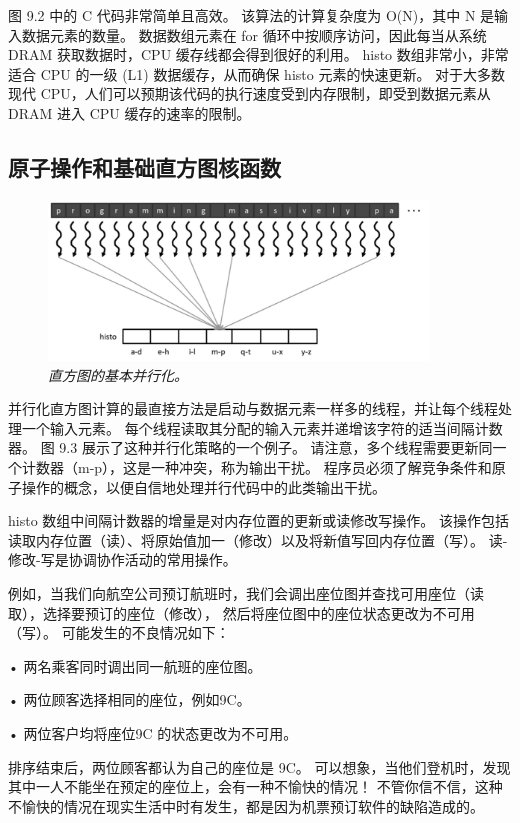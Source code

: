 图 9.2 中的 C 代码非常简单且高效。 该算法的计算复杂度为 O(N)，其中 N 是输入数据元素的数量。 
数据数组元素在 for 循环中按顺序访问，因此每当从系统 DRAM 获取数据时，CPU 缓存线都会得到很好的利用。 
histo 数组非常小，非常适合 CPU 的一级 (L1) 数据缓存，从而确保 histo 元素的快速更新。 
对于大多数现代 CPU，人们可以预期该代码的执行速度受到内存限制，即受到数据元素从 DRAM 进入 CPU 缓存的速率的限制。

\subsection{原子操作和基础直方图核函数}
\begin{figure}[H]
	\centering
	\includegraphics[width=0.9\textwidth]{figs/F9.3.png}
	\caption{\textit{直方图的基本并行化。}}
\end{figure}

并行化直方图计算的最直接方法是启动与数据元素一样多的线程，并让每个线程处理一个输入元素。 
每个线程读取其分配的输入元素并递增该字符的适当间隔计数器。 图 9.3 展示了这种并行化策略的一个例子。 
请注意，多个线程需要更新同一个计数器（m-p），这是一种冲突，称为输出干扰。 
程序员必须了解竞争条件和原子操作的概念，以便自信地处理并行代码中的此类输出干扰。

histo 数组中间隔计数器的增量是对内存位置的更新或读修改写操作。 
该操作包括读取内存位置（读）、将原始值加一（修改）以及将新值写回内存位置（写）。 读-修改-写是协调协作活动的常用操作。

例如，当我们向航空公司预订航班时，我们会调出座位图并查找可用座位（读取），选择要预订的座位（修改），
然后将座位图中的座位状态更改为不可用 （写）。 可能发生的不良情况如下：

• 两名乘客同时调出同一航班的座位图。

• 两位顾客选择相同的座位，例如9C。

• 两位客户均将座位9C 的状态更改为不可用。

排序结束后，两位顾客都认为自己的座位是 9C。 
可以想象，当他们登机时，发现其中一人不能坐在预定的座位上，会有一种不愉快的情况！ 
不管你信不信，这种不愉快的情况在现实生活中时有发生，都是因为机票预订软件的缺陷造成的。

